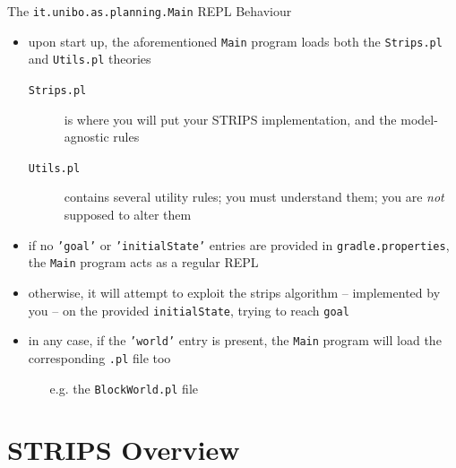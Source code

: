 \documentclass[presentation]{beamer}\mode<presentation>{\usetheme{AMSBolognaFC}}
\begin{document}
\begin{frame}{The \texttt{it.unibo.as.planning.\alert{Main}} REPL Behaviour}

\begin{itemize}
    \item upon start up, the aforementioned \texttt{Main} program loads both the \texttt{Strips.pl} and \texttt{Utils.pl} theories
    \begin{description}
        \item[\texttt{Strips.pl}] is where you will put your STRIPS implementation, and the model-agnostic rules

        \item[\texttt{Utils.pl}] contains several utility rules; you must \alert{understand} them; you are \emph{not} supposed to alter them
    \end{description}

    \item if no \texttt{'\alert{goal}'} or \texttt{'\alert{initialState}'} entries are provided in  \texttt{gradle.properties}, the \texttt{Main} program acts as a regular REPL
    \vfill

    \item otherwise, it will attempt to exploit the strips algorithm -- implemented by you -- on the provided \texttt{\alert{initialState}}, trying to reach \texttt{\alert{goal}}

    \item in any case, if the \texttt{'\alert{world}'} entry is present, the \texttt{Main} program will load the corresponding \texttt{.pl} file too
    \begin{itemize}
        \item[e.g.] the \texttt{BlockWorld.pl} file
    \end{itemize}
\end{itemize}

\end{frame}

\section{STRIPS Overview}
\end{document}
